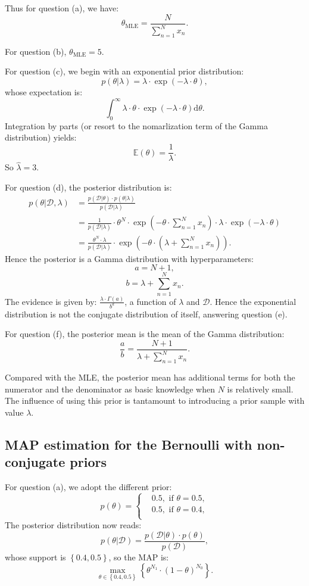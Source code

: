 \documentclass[UTF8]{ctexart}
\begin{document}
Thus for question (a), we have:
$$\theta_{\text{MLE}} = \frac{N}{\sum_{n=1}^{N}x_{n}}.$$

For question (b), $\theta_{\text{MLE}}=5$.

For question (c), we begin with an exponential prior distribution:
$$p(\theta|\lambda)=\lambda\cdot \exp(-\lambda\cdot\theta),$$
whose expectation is:
$$\int_{0}^{\infty}\lambda\cdot\theta\cdot\exp(-\lambda\cdot\theta)\text{d}\theta.$$
Integration by parts (or resort to the nomarlization term of the Gamma distribution) yields:
$$\mathbb{E}(\theta)=\frac{1}{\lambda}.$$
So $\hat{\lambda}=3.$

For question (d), the posterior distribution is:
$$
\begin{aligned}
p(\theta|\mathcal{D},\lambda)&=\frac{p(\mathcal{D}|\theta)\cdot p(\theta|\lambda)}{p(\mathcal{D}|\lambda)}\\
&=\frac{1}{p(\mathcal{D}|\lambda)}\cdot \theta^{N}\cdot\exp(-\theta\cdot\sum_{n=1}^{N}x_{n})\cdot \lambda\cdot \exp(-\lambda\cdot\theta)\\
&=\frac{\theta^{N}\cdot \lambda}{p(\mathcal{D}|\lambda)}\cdot\exp\left(-\theta\cdot\left(\lambda+\sum_{n=1}^{N}x_{n}\right)\right).
\end{aligned}
$$
Hence the posterior is a Gamma distribution with hyperparameters:
$$a=N+1,$$
$$b=\lambda+\sum_{n=1}^{N}x_{n}.$$
The evidence is given by: $\frac{\lambda\cdot \Gamma(a)}{b^{a}}$, a function of $\lambda$ and $\mathcal{D}$.
Hence the exponential distribution is not the conjugate distribution of itself, answering question (e).

For question (f), the posterior mean is the mean of the Gamma distribution:
$$\frac{a}{b}=\frac{N+1}{\lambda+\sum_{n=1}^{N}x_{n}}.$$

Compared with the MLE, the posterior mean has additional terms for both the numerator and the denominator as basic knowledge when $N$ is relatively small.
The influence of using this prior is tantamount to introducing a prior sample with value $\lambda$.


\subsection{MAP estimation for the Bernoulli with non-conjugate priors}
For question (a), we adopt the different prior:
$$
p(\theta)=\left\{
\begin{aligned}
&0.5,\text{ if }\theta=0.5,\\
&0.5,\text{ if }\theta=0.4,\\
\end{aligned}
\right.
$$
The posterior distribution now reads:
$$p(\theta|\mathcal{D})=\frac{p(\mathcal{D}|\theta)\cdot p(\theta)}{p(\mathcal{D})},$$
whose support is $\left\{0.4,0.5\right\}$, so the MAP is:
$$\max_{\theta\in\left\{0.4,0.5\right\}}\left\{\theta^{N_{1}}\cdot(1-\theta)^{N_{0}} \right\}.$$
\end{document}
